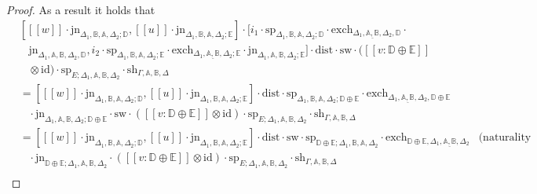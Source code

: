 \documentclass[10pt,a4paper]{amsart}
\theoremstyle{definition}
\theoremstyle{definition}
\theoremstyle{definition}
\theoremstyle{definition}
\theoremstyle{definition}
\theoremstyle{definition}
\begin{document}
\begin{proof}
As a result it holds that 
\begin{align*}
  & [[\![ w ]\!] \cdot \text{jn}_{\Delta_{1} ,\mathbb{B},\mathbb{A},  \Delta_{2};\mathbb{D}},  [\![u ]\!] \cdot \text{jn}_{\Delta_{1} ,\mathbb{B},\mathbb{A},  \Delta_{2};\mathbb{E}}] \cdot [ i_1 \cdot  \text{sp}_{\Delta_{1}, \mathbb{B}, \mathbb{A}, \Delta_{2};\mathbb{D}} \cdot  \text{exch}_{\Delta_{1},\underline{\mathbb{A},\mathbb{B}},  \Delta_{2},\mathbb{D}} \cdot   \\
  & \hspace{10pt}  \text{jn}_{\Delta_{1},\mathbb{A},\mathbb{B},  \Delta_{2},\mathbb{D}},  i_2 \cdot  \text{sp}_{\Delta_{1}, \mathbb{B}, \mathbb{A}, \Delta_{2};\mathbb{E}} \cdot  \text{exch}_{\Delta_{1},\underline{\mathbb{A},\mathbb{B}},  \Delta_{2};\mathbb{E}} \cdot  \text{jn}_{\Delta_{1},\mathbb{A},\mathbb{B},  \Delta_{2};\mathbb{E}} ] \cdot \text{dist} \cdot \text{sw} \cdot ([\![  v : \mathbb{D} \oplus \mathbb{E}  ]\!] \\
  & \hspace{10pt} \otimes \text{id})  \cdot\text{sp}_{E; \Delta_{1},\mathbb{A},\mathbb{B},  \Delta_{2}} \cdot \text{sh}_{\Gamma,\mathbb{A}, \mathbb{B},\Delta} \\ 
  & = [[\![ w ]\!] \cdot \text{jn}_{\Delta_{1} ,\mathbb{B},\mathbb{A},  \Delta_{2};\mathbb{D}},  [\![u ]\!] \cdot \text{jn}_{\Delta_{1} ,\mathbb{B},\mathbb{A},  \Delta_{2};\mathbb{E}}] \cdot \text{dist} \cdot \text{sp}_{\Delta_{1}, \mathbb{B}, \mathbb{A}, \Delta_{2}; \mathbb{D} \oplus\mathbb{E}} \cdot  \text{exch}_{\Delta_{1},\underline{\mathbb{A},\mathbb{B}},  \Delta_{2}, \mathbb{D} \oplus\mathbb{E}}\\
  & \hspace{10pt}  \cdot  \text{jn}_{\Delta_{1},\mathbb{A},\mathbb{B},  \Delta_{2}; \mathbb{D} \oplus\mathbb{E}}  \cdot \text{sw} \cdot ([\![  v : \mathbb{D} \oplus \mathbb{E}  ]\!] \otimes \text{id})  \cdot\text{sp}_{E; \Delta_{1},\mathbb{A},\mathbb{B},  \Delta_{2}} \cdot \text{sh}_{\Gamma,\mathbb{A}, \mathbb{B},\Delta}\\
  & = [[\![ w ]\!] \cdot \text{jn}_{\Delta_{1} ,\mathbb{B},\mathbb{A},  \Delta_{2};\mathbb{D}},  [\![u ]\!] \cdot \text{jn}_{\Delta_{1} ,\mathbb{B},\mathbb{A},  \Delta_{2};\mathbb{E}}] \cdot \text{dist} \cdot \text{sw} \cdot \text{sp}_{\mathbb{D} \oplus\mathbb{E};\Delta_{1}, \mathbb{B}, \mathbb{A}, \Delta_{2}} \cdot  \text{exch}_{\mathbb{D} \oplus\mathbb{E}, \Delta_{1},\underline{\mathbb{A},\mathbb{B}},  \Delta_{2}} & {\text{(naturality of sw)}} \\
  & \hspace{10pt} \cdot  \text{jn}_{\mathbb{D} \oplus\mathbb{E};\Delta_{1},\mathbb{A},\mathbb{B},  \Delta_{2}} \cdot ([\![  v : \mathbb{D} \oplus \mathbb{E}  ]\!] \otimes \text{id})  \cdot\text{sp}_{E; \Delta_{1},\mathbb{A},\mathbb{B},  \Delta_{2}} \cdot \text{sh}_{\Gamma,\mathbb{A}, \mathbb{B},\Delta} \\

\end{align*}
\end{proof}
\end{document}
